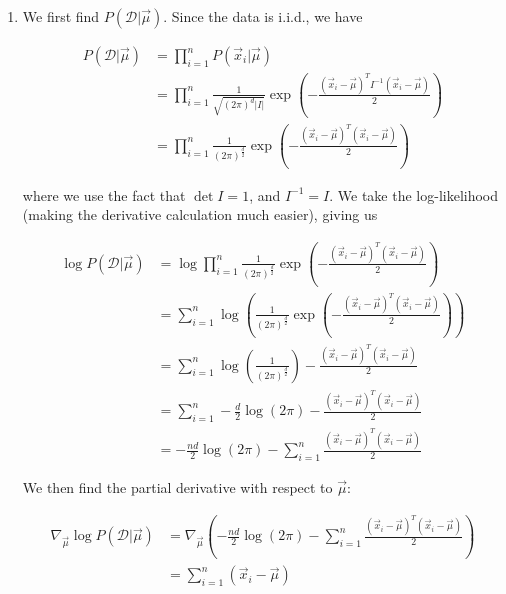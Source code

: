 \documentclass[11pt]{article}
\begin{document}
		\begin{enumerate}
		    \item We first find $P(\mathcal{D} | \vec{\mu})$. Since the data is i.i.d., we have 
		    
		    \begin{align*}
		        P(\mathcal{D} | \vec{\mu}) &= \prod_{i=1}^n P(\vec{x}_i | \vec{\mu}) \\ 
		        &= \prod_{i=1}^n \frac{1}{\sqrt{\left ( 2 \pi \right )^d |I|}} \exp \left ( -\frac{\left ( \vec{x}_i - \vec{\mu} \right )^TI^{-1} \left ( \vec{x}_i - \vec{\mu} \right )}{2} \right ) \\
		        &= \prod_{i=1}^n \frac{1}{\left ( 2 \pi \right ) ^{\frac{d}{2}}} \exp \left (-\frac{\left ( \vec{x}_i - \vec{\mu} \right )^T\left ( \vec{x}_i - \vec{\mu} \right )}{2} \right )
		    \end{align*}
		    
		   where we use the fact that $\det I = 1$, and $I^{-1} = I$. 
		   We take the log-likelihood (making the derivative calculation much easier), giving us 
		    
		    \begin{align*}
		        \log P(\mathcal{D} | \vec{\mu}) &= \log \prod_{i=1}^n \frac{1}{\left ( 2 \pi \right ) ^{\frac{d}{2}}} \exp \left (-\frac{\left ( \vec{x}_i - \vec{\mu} \right )^T\left ( \vec{x}_i - \vec{\mu} \right )}{2} \right ) \\ 
		        &= \sum_{i=1}^n \log \left ( \frac{1}{\left ( 2 \pi \right ) ^{\frac{d}{2}}} \exp \left (-\frac{\left ( \vec{x}_i - \vec{\mu} \right )^T\left ( \vec{x}_i - \vec{\mu} \right )}{2} \right ) \right ) \\
		        &= \sum_{i=1}^n \log \left (\frac{1}{\left ( 2 \pi \right ) ^{\frac{d}{2}}} \right ) -\frac{\left ( \vec{x}_i - \vec{\mu} \right )^T\left ( \vec{x}_i - \vec{\mu} \right )}{2} \\
		        &= \sum_{i=1}^n -\frac{d}{2} \log \left ( 2 \pi \right )  -\frac{\left ( \vec{x}_i - \vec{\mu} \right )^T\left ( \vec{x}_i - \vec{\mu} \right )}{2} \\
		        &= -\frac{nd}{2} \log(2\pi) - \sum_{i=1}^n \frac{\left ( \vec{x}_i - \vec{\mu} \right )^T\left ( \vec{x}_i - \vec{\mu} \right )}{2} 
		    \end{align*}
		    
		    We then find the partial derivative with respect to $\vec{\mu}$:
		    
		    \begin{align*}
		        \nabla_{\vec{\mu}} \log P(\mathcal{D} | \vec{\mu}) &= \nabla_{\vec{\mu}} \left ( -\frac{nd}{2} \log(2\pi) - \sum_{i=1}^n \frac{\left ( \vec{x}_i - \vec{\mu} \right )^T\left ( \vec{x}_i - \vec{\mu} \right )}{2} \right ) \\
		        &= \sum_{i=1}^n (\vec{x}_i - \vec{\mu} )
		    \end{align*}
		    

\end{enumerate}
\end{document}
